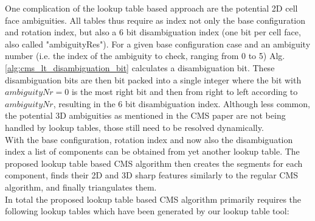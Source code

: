 One complication of the lookup table based approach are the potential 2D cell face ambiguities. All tables thus require as index not only the base configuration and rotation index, but also a $6$ bit disambiguation
index (one bit per cell face, also called "ambiguityRes"). For a given base configuration case and an ambiguity number (i.e. the index of the ambiguity to check, ranging from 0 to 5) Alg. \ref{alg:cms_lt_disambiguation_bit} calculates a
disambiguation bit. These disambiguation bits are then bit packed into a single integer where the bit with $ambiguityNr = 0$ is the most right bit and then from right to left according to $ambiguityNr$, resulting
in the $6$ bit disambiguation index. Although less common, the potential 3D ambiguities as mentioned in the CMS paper are not being handled by lookup tables, those still need to be resolved dynamically.\\
With the base configuration, rotation index and now also the disambiguation index a list of components can be obtained from yet another lookup table. The proposed lookup table based CMS algorithm then creates the segments for each
component, finds their 2D and 3D sharp features similarly to the regular CMS algorithm, and finally triangulates them.\\
In total the proposed lookup table based CMS algorithm primarily requires the following lookup tables which have been generated by our lookup table tool:

